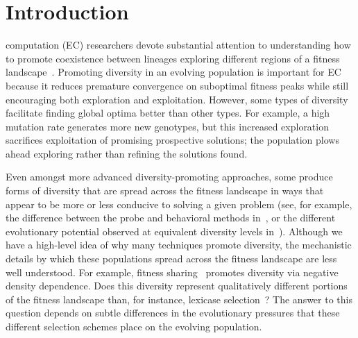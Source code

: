 \section{Introduction}

 computation (EC) researchers devote substantial attention to understanding how to promote coexistence between lineages exploring different regions of a fitness landscape~\cite{goldberg_genetic_1987,mahfoud_niching_1995, mouret_using_2009,pugh_confronting_2015}. 
Promoting diversity in an evolving population is important for EC because it reduces premature convergence on suboptimal fitness peaks while still encouraging both exploration and exploitation. However, some types of diversity facilitate finding global optima better than other types. For example, a high mutation rate generates more new genotypes, but this increased exploration sacrifices exploitation of promising prospective solutions; the population plows ahead exploring rather than refining the solutions found.

Even amongst more advanced diversity-promoting approaches, some produce forms of diversity that are spread across the fitness landscape in ways that appear to be more or less conducive to solving a given problem (see, for example, the difference between the probe and behavioral methods in~\cite{mouret_using_2009}, or the different evolutionary potential observed at equivalent diversity levels in~\cite{walker_evolutionary_2012}). Although we have a high-level idea of why many techniques promote diversity, the mechanistic details by which these populations spread across the fitness landscape are less well understood. For example, fitness sharing~\cite{goldberg_genetic_1987} promotes diversity via negative density dependence. Does this diversity represent qualitatively different portions of the fitness landscape than, for instance, lexicase selection~\cite{spector_assessment_2012}? The answer to this question depends on subtle differences in the evolutionary pressures that these different selection schemes place on the evolving population.

